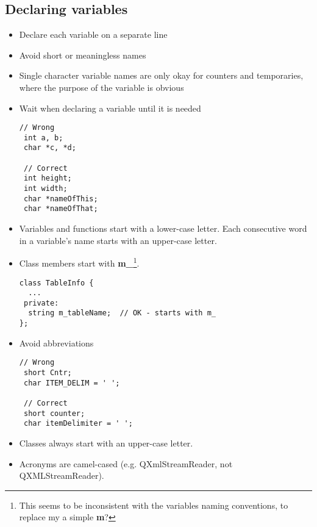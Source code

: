 \documentclass[a4paper,12pt]{article}
\begin{document}
\subsection{Declaring variables}

\begin{itemize}
\item  Declare each variable on a separate line
\item  Avoid short or meaningless names
\item  Single character variable names are only okay for counters and temporaries, where the purpose of the variable is obvious
\item  Wait when declaring a variable until it is needed
\begin{lstlisting}[breaklines]
// Wrong
 int a, b;
 char *c, *d;

 // Correct
 int height;
 int width;
 char *nameOfThis;
 char *nameOfThat;
 \end{lstlisting}
\item  Variables and functions start with a lower-case letter. Each consecutive word in a variable's name starts with an upper-case letter.
\item  Class members start with {\bf m\_}\footnote{This seems to be inconsistent with the variables naming conventions, to replace my a simple {\bf m}?}. 
\begin{lstlisting}[breaklines]
 class TableInfo {
  ...
 private:
  string m_tableName;  // OK - starts with m_
};
 \end{lstlisting}

\item  Avoid abbreviations
\begin{lstlisting}[breaklines]
 // Wrong
 short Cntr;
 char ITEM_DELIM = ' ';

 // Correct
 short counter;
 char itemDelimiter = ' ';
 \end{lstlisting}
\item  Classes always start with an upper-case letter. 
\item  Acronyms are camel-cased (e.g. QXmlStreamReader, not QXMLStreamReader).
\end{itemize}

\end{document}
